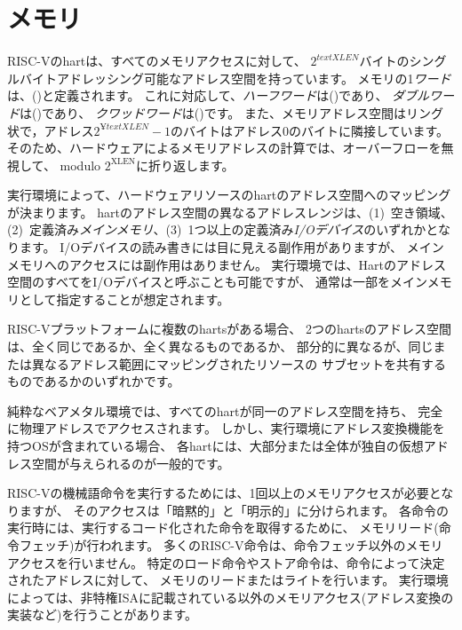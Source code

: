 \section{メモリ}

RISC-Vのhartは、すべてのメモリアクセスに対して、
$2^{text{XLEN}}$バイトのシングルバイトアドレッシング可能なアドレス空間を持っています。 
メモリの1{\em ワード}は、()と定義されます。
これに対応して、{\em ハーフワード}は()であり、
{\em ダブルワード}は()であり、
{\em クワッドワード}は()です。
また、メモリアドレス空間はリング状で，アドレス$2^{¥text{XLEN}}-1$のバイトはアドレス0のバイトに隣接しています。
そのため、ハードウェアによるメモリアドレスの計算では、オーバーフローを無視して、
modulo $2^{\text{XLEN}}$に折り返します。

実行環境によって、ハードウェアリソースのhartのアドレス空間へのマッピングが決まります。
hartのアドレス空間の異なるアドレスレンジは、(1)~空き領域、(2)~定義済み{\em メインメモリ}、(3)~1つ以上の定義済み{\em I/Oデバイス}のいずれかとなります。
I/Oデバイスの読み書きには目に見える副作用がありますが、
メインメモリへのアクセスには副作用はありません。
実行環境では、Hartのアドレス空間のすべてをI/Oデバイスと呼ぶことも可能ですが、
通常は一部をメインメモリとして指定することが想定されます。

RISC-Vプラットフォームに複数のhartsがある場合、
2つのhartsのアドレス空間は、全く同じであるか、全く異なるものであるか、
部分的に異なるが、同じまたは異なるアドレス範囲にマッピングされたリソースの
サブセットを共有するものであるかのいずれかです。

\begin{commentary}
純粋なベアメタル環境では、すべてのhartが同一のアドレス空間を持ち、
完全に物理アドレスでアクセスされます。
しかし、実行環境にアドレス変換機能を持つOSが含まれている場合、
各hartには、大部分または全体が独自の仮想アドレス空間が与えられるのが一般的です。
\end{commentary}

RISC-Vの機械語命令を実行するためには、1回以上のメモリアクセスが必要となりますが、
そのアクセスは「暗黙的」と「明示的」に分けられます。
各命令の実行時には、実行するコード化された命令を取得するために、
メモリリード(命令フェッチ)が行われます。
多くのRISC-V命令は、命令フェッチ以外のメモリアクセスを行いません。
特定のロード命令やストア命令は、命令によって決定されたアドレスに対して、
メモリのリードまたはライトを行います。
実行環境によっては、非特権ISAに記載されている以外のメモリアクセス(アドレス変換の実装など)を行うことがあります。

